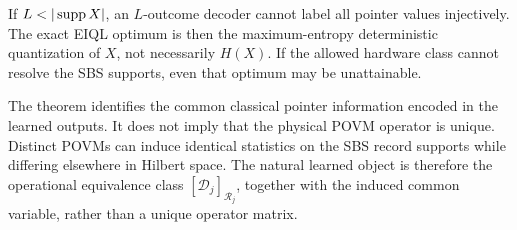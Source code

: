 \begin{remark}
If $L<|\supp X|$, an $L$-outcome decoder cannot label all pointer values injectively. The exact EIQL optimum is then the maximum-entropy deterministic quantization of $X$, not necessarily $H(X)$. If the allowed hardware class cannot resolve the SBS supports, even that optimum may be unattainable.
\end{remark}

\begin{remark}
The theorem identifies the common classical pointer information encoded in the learned outputs. It does not imply that the physical POVM operator is unique. Distinct POVMs can induce identical statistics on the SBS record supports while differing elsewhere in Hilbert space. The natural learned object is therefore the operational equivalence class $[\mathcal D_j]_{\mathcal R_j}$, together with the induced common variable, rather than a unique operator matrix.
\end{remark}
